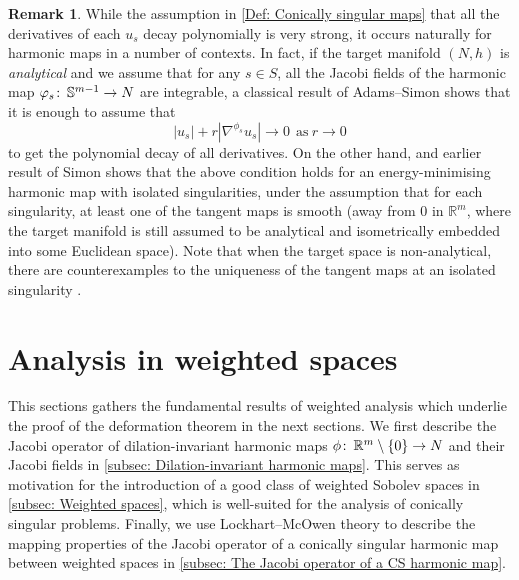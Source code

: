 \documentclass{article}
\numberwithin{equation}{section}        %
\theoremstyle{bfnote}
\theoremstyle{definition}
\theoremstyle{bfremark}
\newtheorem{rem}[thm]{Remark}               %
\newcommand{\col}{\colon \thinspace}        %
\newcommand{\R}{\mathbb{R}}                 %
\newcommand{\Sp}{\mathbb{S}}                %
\begin{document}
\begin{rem}
    While the assumption in \cref{Def: Conically singular maps} that all the derivatives of each $u_s$ decay polynomially is very strong, it occurs naturally for harmonic maps in a number of contexts. In fact, if the target manifold $(N,h)$ is \emph{analytical} and we assume that for any $s \in S$, all the Jacobi fields of the harmonic map $\varphi_s \col \Sp^{m-1} \rightarrow N$ are integrable, a classical result of Adams--Simon \cite{adams1988rates} shows that it is enough to assume that
    \begin{equation*}
        |u_s | + r|\nabla^{\phi_s} u_s| \to 0 ~~ \text{as} ~ r \to 0
    \end{equation*}
    to get the polynomial decay of all derivatives. On the other hand, and earlier result of Simon \cite{simon1983asymptotics,simon1993theorems} shows that the above condition holds for an energy-minimising harmonic map with isolated singularities, under the assumption that for each singularity, at least one of the tangent maps is smooth (away from $0$ in $\R^m$, where the target manifold is still assumed to be analytical and isometrically embedded into some Euclidean space). Note that when the target space is non-analytical, there are counterexamples to the uniqueness of the tangent maps at an isolated singularity \cite{white1992nonunique}.
\end{rem}

    \section{Analysis in weighted spaces}       \label{sec: Analysis in weighted spaces}

This sections gathers the fundamental results of weighted analysis which underlie the proof of the deformation theorem in the next sections. We first describe the Jacobi operator of dilation-invariant harmonic maps $\phi \col \R^m \setminus \{0\} \to N$ and their Jacobi fields in \cref{subsec: Dilation-invariant harmonic maps}. This serves as motivation for the introduction of a good class of weighted Sobolev spaces in \cref{subsec: Weighted spaces}, which is well-suited for the analysis of conically singular problems. Finally, we use Lockhart--McOwen theory \cite{Lockhart1985ellipticOperators_on_noncompact_mfds} to describe the mapping properties of the Jacobi operator of a conically singular harmonic map between weighted spaces in \cref{subsec: The Jacobi operator of a CS harmonic map}.
\end{document}
